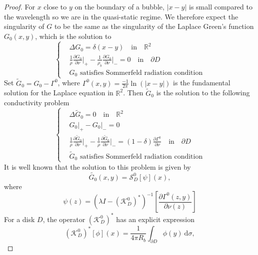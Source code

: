 \documentclass[a4paper]{article}
\theoremstyle{definition}
\newcommand{\R}{\mathbb{R}}
\renewcommand{\S}{\mathcal{S}}
\newcommand{\K}{\mathcal{K}}
\newcommand{\dx}{\: \mathrm{d}}
\newcommand{\ds}{\displaystyle}
\begin{document}
\begin{proof}
For $x$ close to $y$ on the boundary of a bubble, $|x-y|$ is small compared to the wavelength so we are in the quasi-static regime. We therefore expect the singularity of $G$ to be the same as the singularity of the Laplace Green's function $G_0(x,y)$, which is the solution to 
\begin{equation*}
\left\{
\begin{array}{ll}
	&\ds \Delta G_0 = \delta(x-y) \quad \text{in}\quad \R^2 \\
	&\ds \frac{1}{\rho}\frac{\partial G_0}{\partial \nu}\bigg|_+ - \frac{1}{\rho_b}\frac{\partial G_0}{\partial \nu}\bigg|_- = 0 \quad \text{in} \quad \partial D \\
	&\ds G_0 \text{ satisfies Sommerfeld radiation condition} 
\end{array}
\right.	
\end{equation*}
Set $\tilde{G}_0 = G_0-\Gamma^0$, where $\Gamma^0(x,y)= \frac{-1}{2\pi}\ln(|x-y|)$ is the fundamental solution for the Laplace equation in $\R^2$. Then $\tilde{G}_0$ is the solution to the following conductivity problem
\begin{equation*}
\left\{
\begin{array}{ll}
&\ds \Delta \tilde{G}_0 = 0 \quad \text{in}\quad \R^2 \\
&\ds G_0\big|_+-G_0\big|_- = 0 \\
&\ds \frac{1}{\rho}\frac{\partial \tilde{G}_0}{\partial \nu}\bigg|_+ - \frac{1}{\rho}\frac{\partial \tilde{G}_0}{\partial \nu}\bigg|_- = (1-\delta)\frac{\partial \Gamma^0}{\partial \nu} \quad \text{in} \quad \partial D \\
&\ds \tilde{G}_0 \text{ satisfies Sommerfeld radiation condition} 
\end{array}
\right.	
\end{equation*}
It is well known that the solution to this problem is given by
\begin{equation*}
\tilde{G_0}(x,y) = \S_D^0 \left[\psi\right](x),
\end{equation*}
where
\begin{equation*}
\psi(z) = \left(\lambda I - \left( \K_D^0 \right)^*\right)^{-1} \left[ \frac{\partial\Gamma^0(z,y)}{\partial \nu(z)} \right] 
\end{equation*}
For a disk $D$, the operator $\left(\K_D^0\right)^*$ has an explicit expression
\begin{equation*}
\left(\K_D^0\right)^*[\phi](x) = \frac{1}{4\pi R_b}\int_{\partial D} \phi(y)\dx \sigma,

\end{equation*}
\end{proof}
\end{document}
